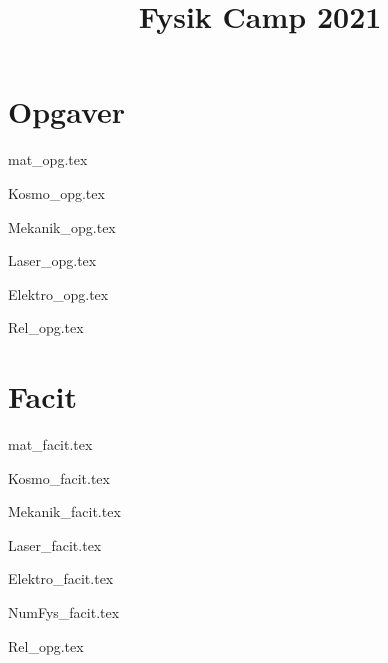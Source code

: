 \documentclass[a4paper]{memoir}
\title{Fysik Camp 2021}
\begin{document}


\newpage
\begin{KeepFromToc}
    \tableofcontents
\end{KeepFromToc}
\newpage
\mainmatter

\part{Opgaver}

{mat_opg.tex}

{Kosmo_opg.tex}
\newpage
\printbibliography[keyword=kosmo, heading=subbibliography, title={Litteraturliste for Kosmologi}]

{Mekanik_opg.tex}

{Laser_opg.tex}

{Elektro_opg.tex}
\newpage
{}

{Rel_opg.tex}

\setcounter{chapter}{0} %

\part{Facit}
{mat_facit.tex}

{Kosmo_facit.tex}

{Mekanik_facit.tex}

{Laser_facit.tex}

{Elektro_facit.tex}

{NumFys_facit.tex}

 {Rel_opg.tex}
\end{document}
